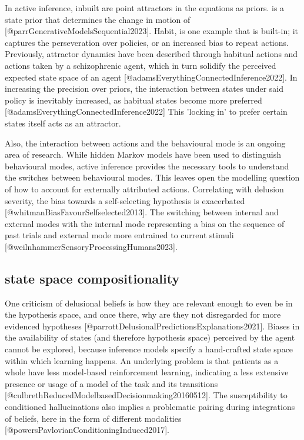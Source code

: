 \documentclass{article}
\begin{document}
In active inference, inbuilt are point attractors in the equations as priors.  is a state prior that determines the change in motion of  [@parrGenerativeModelsSequential2023]. Habit, is one example that is built-in; it captures the perseveration over policies, or an increased bias to repeat actions. Previously, attractor dynamics have been described through habitual actions and actions taken by a schizophrenic agent, which in turn solidify the perceived expected state space of an agent [@adamsEverythingConnectedInference2022]. In increasing the precision over priors, the interaction between states under said policy is inevitably increased, as habitual states become more preferred [@adamsEverythingConnectedInference2022] This 'locking in' to prefer certain states itself acts as an attractor.

Also, the interaction between actions and the behavioural mode is an ongoing area of research. While hidden Markov models have been used to distinguish behavioural modes, active inference provides the necessary tools to understand the switches between behavioural modes. This leaves open the modelling question of how to account for externally attributed actions. Correlating with delusion severity, the bias towards a self-selecting hypothesis is exacerbated [@whitmanBiasFavourSelfselected2013]. The switching between internal and external modes with the internal mode representing a bias on the sequence of past trials and external mode more entrained to current stimuli [@weilnhammerSensoryProcessingHumans2023].

\subsection{state space compositionality}

One criticism of delusional beliefs is how they are relevant enough to even be in the hypothesis space, and once there, why are they not disregarded for more evidenced hypotheses [@parrottDelusionalPredictionsExplanations2021]. Biases in the availability of states (and therefore hypothesis space) perceived by the agent cannot be explored, because inference models specify a hand-crafted state space within which learning happens. An underlying problem is that patients as a whole have less model-based reinforcement learning, indicating a less extensive presence or usage of a model of the task and its transitions [@culbrethReducedModelbasedDecisionmaking20160512]. The susceptibility to conditioned hallucinations also implies a problematic pairing during integrations of beliefs, here in the form of different modalities [@powersPavlovianConditioningInduced2017].
\end{document}
